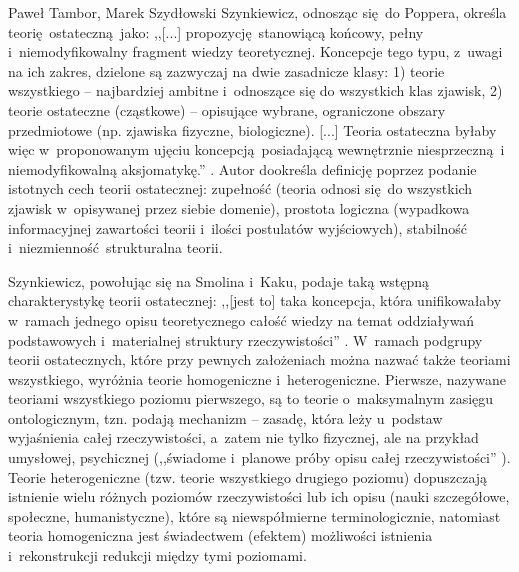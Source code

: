 \begin{artplenv}{Paweł Tambor, Marek Szydłowski}
Szynkiewicz, odnosząc się~do Poppera, określa teorię~ostateczną~jako: ,,[...] propozycję~stanowiącą końcowy, pełny i~niemodyfikowalny fragment wiedzy teoretycznej. Koncepcje tego typu, z~uwagi na ich zakres, dzielone są zazwyczaj na dwie zasadnicze klasy: 1) teorie wszystkiego -- najbardziej ambitne i~odnoszące się do wszystkich klas zjawisk, 2) teorie ostateczne (cząstkowe) -- opisujące wybrane, ograniczone obszary przedmiotowe (np. zjawiska fizyczne, biologiczne). [...] Teoria ostateczna byłaby więc w~proponowanym ujęciu koncepcją~posiadającą wewnętrznie niesprzeczną~i niemodyfikowalną aksjomatykę.''
\parencite[][s.~1274–1275]{szynkiewicz_teorie_2011}. %
 Autor dookreśla definicję poprzez podanie istotnych cech teorii ostatecznej: zupełność (teoria odnosi się~do wszystkich zjawisk w~opisywanej przez siebie domenie), prostota logiczna (wypadkowa informacyjnej zawartości teorii i~ilości postulatów wyjściowych), stabilność i~niezmienność~strukturalna teorii.

Szynkiewicz, powołując się na Smolina i~Kaku, podaje taką wstępną charakterystykę teorii ostatecznej: ,,[jest to] taka koncepcja, która unifikowałaby w~ramach jednego opisu teoretycznego całość wiedzy na temat oddziaływań podstawowych i~materialnej struktury rzeczywistości''
\parencite[][s.~16]{szynkiewicz_teorie_2009}. %
 W~ramach podgrupy teorii ostatecznych, które przy pewnych założeniach można nazwać także teoriami wszystkiego, wyróżnia teorie homogeniczne i~heterogeniczne. Pierwsze, nazywane teoriami wszystkiego poziomu pierwszego, są to teorie o~maksymalnym zasięgu ontologicznym, tzn. podają mechanizm -- zasadę, która leży u~podstaw wyjaśnienia całej rzeczywistości, a~zatem nie tylko fizycznej, ale na przykład umysłowej, psychicznej (,,świadome i~planowe próby opisu całej rzeczywistości'' 
\parencite[][s.~30]{szynkiewicz_teorie_2009}%
). Teorie heterogeniczne (tzw. teorie wszystkiego drugiego poziomu) dopuszczają istnienie wielu różnych poziomów rzeczywistości lub ich opisu (nauki szczegółowe, społeczne, humanistyczne), które są niewspółmierne terminologicznie, natomiast teoria homogeniczna jest świadectwem (efektem) możliwości istnienia i~rekonstrukcji redukcji między tymi poziomami.


\end{artplenv}
